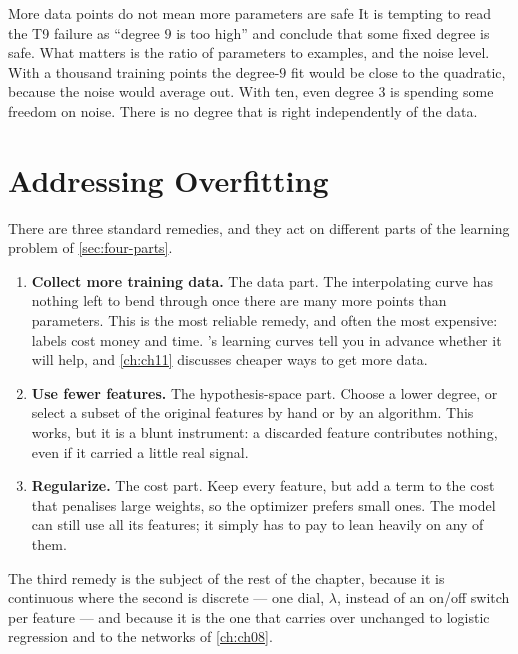 \begin{pitfall}{More data points do not mean more parameters are safe}
It is tempting to read the T9 failure as ``degree $9$ is too high'' and conclude
that some fixed degree is safe. What matters is the ratio of parameters to
examples, and the noise level. With a thousand training points the degree-$9$
fit would be close to the quadratic, because the noise would average out. With
ten, even degree $3$ is spending some freedom on noise. There is no degree that
is right independently of the data.
\end{pitfall}

\section{Addressing Overfitting}
\label{sec:remedies}

There are three standard remedies, and they act on different parts of the
learning problem of \cref{sec:four-parts}.

\begin{enumerate}
  \item \textbf{Collect more training data.} The data part. The interpolating
        curve has nothing left to bend through once there are many more points
        than parameters. This is the most reliable remedy, and often the most
        expensive: labels cost money and time. 's learning curves
        tell you in advance whether it will help, and \cref{ch:ch11} discusses
        cheaper ways to get more data.
  \item \textbf{Use fewer features.} The hypothesis-space part. Choose a lower
        degree, or select a subset of the original features by hand or by an
        algorithm. This works, but it is a blunt instrument: a discarded
        feature contributes nothing, even if it carried a little real signal.
  \item \textbf{Regularize.} The cost part. Keep every feature, but add a term
        to the cost that penalises large weights, so the optimizer prefers small
        ones. The model can still use all its features; it simply has to pay to
        lean heavily on any of them.
\end{enumerate}

The third remedy is the subject of the rest of the chapter, because it is
continuous where the second is discrete --- one dial, $\lambda$, instead of an
on/off switch per feature --- and because it is the one that carries over
unchanged to logistic regression and to the networks of \cref{ch:ch08}.

